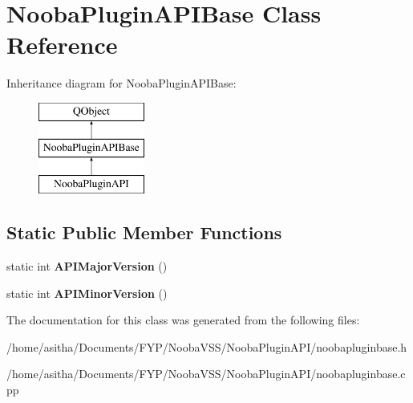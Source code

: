 \hypertarget{class_nooba_plugin_a_p_i_base}{\section{Nooba\-Plugin\-A\-P\-I\-Base Class Reference}
\label{class_nooba_plugin_a_p_i_base}
}
Inheritance diagram for Nooba\-Plugin\-A\-P\-I\-Base\-:\begin{figure}[H]
\begin{center}
\leavevmode
\includegraphics[height=3.000000cm]{class_nooba_plugin_a_p_i_base}
\end{center}
\end{figure}
\subsection*{Static Public Member Functions}
\begin{DoxyCompactItemize}
\item 
\hypertarget{class_nooba_plugin_a_p_i_base_a82408eedc0a13ec10c445c5e9441ecb7}{static int {\bfseries A\-P\-I\-Major\-Version} ()}\label{class_nooba_plugin_a_p_i_base_a82408eedc0a13ec10c445c5e9441ecb7}

\item 
\hypertarget{class_nooba_plugin_a_p_i_base_a75f0dfbe75dea5d77b38f83ec68d1bba}{static int {\bfseries A\-P\-I\-Minor\-Version} ()}\label{class_nooba_plugin_a_p_i_base_a75f0dfbe75dea5d77b38f83ec68d1bba}

\end{DoxyCompactItemize}


The documentation for this class was generated from the following files\-:\begin{DoxyCompactItemize}
\item 
/home/asitha/\-Documents/\-F\-Y\-P/\-Nooba\-V\-S\-S/\-Nooba\-Plugin\-A\-P\-I/noobapluginbase.\-h\item 
/home/asitha/\-Documents/\-F\-Y\-P/\-Nooba\-V\-S\-S/\-Nooba\-Plugin\-A\-P\-I/noobapluginbase.\-cpp\end{DoxyCompactItemize}
